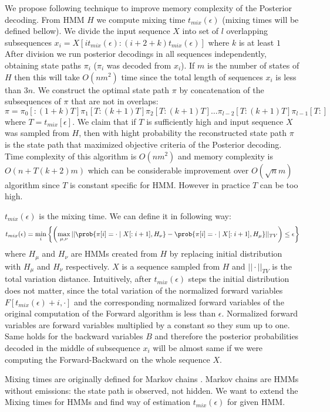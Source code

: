 \def\tmix{t_{mix}(\epsilon)}
We propose following technique to improve memory complexity of the
Posterior decoding.  From HMM $H$ we compute mixing time
$t_{mix}(\epsilon)$ (mixing times will be defined bellow).  We divide the input
sequence $X$ into set of $l$ overlapping subsequences
$x_i=X[it_{mix}(\epsilon):(i+2+k)t_{mix}(\epsilon)]$ where $k$ is at least $1$
After division we run posterior decodings in all sequences independently,
obtaining state paths $\pi_i$ ($\pi_i$ was decoded from $x_i$). If $m$ is the
number of states of $H$ then this will take $O(nm^2)$ time since the total
length of sequences $x_i$ is less than $3n$.  We construct the optimal state
path $\pi$ by concatenation of the subsequences of $\pi$ that are not in
overlaps: \[\pi = \pi_0[:(1+k)T] \pi_1[T:(k+1)T] \pi_2[T:(k+1)T] \dots
\pi_{l-2}[T:(k+1)T] \pi_{l-1}[T:]\] where $T=t_{mix}[\epsilon]$. We claim that
if $T$ is sufficiently high and input sequence $X$ was sampled from $H$, then
with hight probability the reconstructed state path $\pi$ is the state path that
maximized objective criteria of the Posterior decoding.  Time complexity of this
algorithm is $O(nm^2)$ and memory complexity is $O(n+T(k+2)m)$ which can be
considerable improvement over $O(\sqrt n m)$ algorithm since $T$ is constant
specific for HMM. However in practice $T$ can be too high.


$\tmix$ is the mixing time. We can define it in following way:
\[\tmix = \min_{i}\left\{ 
\left(\max_{\mu,\nu} || \prob{\pi[i] = \cdot\mid X[:i+1],H_\nu} - \prob{\pi[i] = \cdot\mid
X[:i+1],H_\mu}||_{TV}\right)\leq \epsilon
\right\}
\] 
where $H_\mu$ and $H_\nu$ are HMMs created from $H$ by replacing initial
distribution with $H_\mu$ and $H_\nu$ respectively.
$X$ is a sequence
sampled from $H$ and $||\cdot||_{TV}$ is the total variation distance.
Intuitively, after $\tmix$ steps the initial distribution does not matter, since
the total variation of the normalized forward variables $F[\tmix+i,\cdot]$
and the corresponding normalized forward variables of the original computation
of the Forward algorithm is less than $\epsilon$. Normalized forward variables
are forward variables multiplied by a constant so they sum up to one. 
Same holds for the backward
variables $B$ and therefore the posterior probabilities decoded in the middle of
subsequence $x_i$ will be almost same if we were computing the Forward-Backward
on the whole sequence $X$.

Mixing times are originally defined for Markov chains \cite{Levin2006}. Markov
chains are HMMs without emissions: the state path is observed, not hidden. We
want to extend the Mixing times for HMMs and find way of estimation $\tmix$ for
given HMM.

